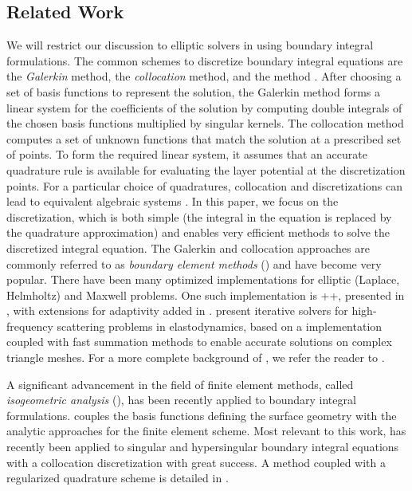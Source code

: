\subsection{Related Work\label{sec:related_work}}
We will restrict our discussion to elliptic \pde solvers in \threed using boundary integral formulations. 
The common schemes to discretize boundary integral equations are the \textit{Galerkin} method, the \textit{collocation} method, and the \textit{\nystrom} method \cite{atkinson2009numerical}.
After choosing a set of basis functions to represent the solution, the Galerkin method forms a linear system for the coefficients of the solution by computing double integrals of the chosen basis functions multiplied by singular kernels.
The collocation method computes a set of unknown functions that match the solution at a prescribed set of points. 
To form the required linear system, it assumes that an accurate quadrature rule is available for evaluating the layer potential at the discretization points. 
For a particular choice of quadratures, collocation and \nystrom discretizations can lead to equivalent algebraic systems \cite[Chapter 13]{K}. 
In this paper, we focus on the \emph{\nystrom} discretization, which is both simple (the integral in the equation is replaced by the quadrature approximation) and enables very efficient methods to solve the discretized integral equation.
The Galerkin and collocation approaches are commonly referred to as \textit{boundary element methods} (\bem) and have become very popular.
There have been many optimized \bem implementations for elliptic (Laplace, Helmholtz) and Maxwell problems. 
One such implementation is \bem++, presented in \cite{smigaj2015solving}, with extensions for adaptivity added in \cite{bespalov2019adaptive,betcke2019adaptive}.
\cite{chaillat2017fast,chaillat2017theory} present iterative solvers for high-frequency scattering problems in elastodynamics, based on a \bem implementation coupled with fast summation methods to enable accurate solutions on complex triangle meshes.
For a more complete background of \bem, we refer the reader to \cite{steinbach2007numerical}.

A significant advancement in the field of finite element methods, called \textit{isogeometric analysis} (\iga)\cite{hughes2005isogeometric}, has been recently applied to boundary integral formulations.  
\iga couples the basis functions defining the surface geometry with the analytic approaches for the finite element scheme. 
Most relevant to this work, \iga has recently been applied to singular and hypersingular boundary integral equations with a collocation discretization \cite{taus2016isogeometric} with great success. 
A \nystrom \iga method coupled with a regularized quadrature scheme is detailed in \cite{zechner2016isogeometric}.

